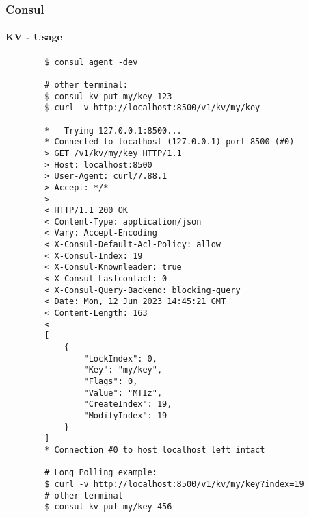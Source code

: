 \begin{frame}[fragile]
	\frametitle{Consul}
	\framesubtitle{KV - Usage}

	\begin{verbatim}
		$ consul agent -dev

		# other terminal:
		$ consul kv put my/key 123
		$ curl -v http://localhost:8500/v1/kv/my/key

		*   Trying 127.0.0.1:8500...
		* Connected to localhost (127.0.0.1) port 8500 (#0)
		> GET /v1/kv/my/key HTTP/1.1
		> Host: localhost:8500
		> User-Agent: curl/7.88.1
		> Accept: */*
		> 
		< HTTP/1.1 200 OK
		< Content-Type: application/json
		< Vary: Accept-Encoding
		< X-Consul-Default-Acl-Policy: allow
		< X-Consul-Index: 19
		< X-Consul-Knownleader: true
		< X-Consul-Lastcontact: 0
		< X-Consul-Query-Backend: blocking-query
		< Date: Mon, 12 Jun 2023 14:45:21 GMT
		< Content-Length: 163
		< 
		[
			{
				"LockIndex": 0,
				"Key": "my/key",
				"Flags": 0,
				"Value": "MTIz",
				"CreateIndex": 19,
				"ModifyIndex": 19
			}
		]
		* Connection #0 to host localhost left intact

		# Long Polling example:
		$ curl -v http://localhost:8500/v1/kv/my/key?index=19
		# other terminal
		$ consul kv put my/key 456
	\end{verbatim}
\end{frame}
